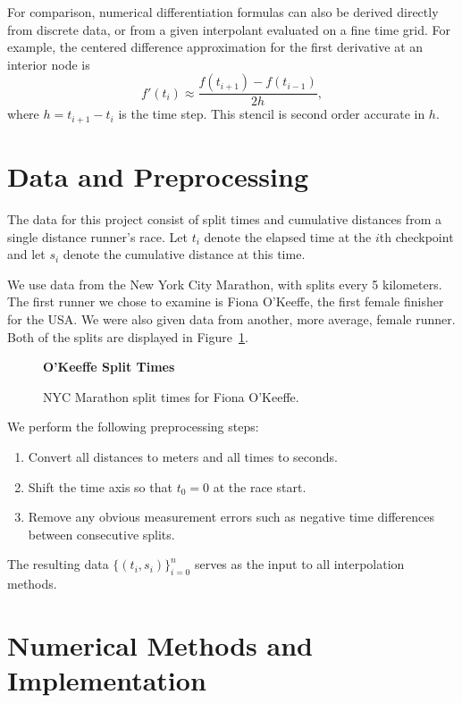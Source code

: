 \documentclass[12pt]{article}
\begin{document}
For comparison, numerical differentiation formulas can also be derived
directly from discrete data, or from a given interpolant evaluated on a fine time grid. For example, the centered difference
approximation for the first derivative at an interior node is
\begin{equation}
f'(t_i) \approx
\frac{f(t_{i+1}) - f(t_{i-1})}{2h},
\label{eq:centered_diff}
\end{equation}
where $h = t_{i+1} - t_i$ is the time step. This stencil is second
order accurate in $h$.

\section{Data and Preprocessing}
The data for this project consist of split times and cumulative
distances from a single distance runner's race. Let $t_i$ denote the elapsed time at the
$i$th checkpoint and let $s_i$ denote the cumulative distance at this
time.

We use data from the New York City Marathon, with splits every 5 kilometers. The first runner we chose to examine is Fiona O'Keeffe, the first female finisher for the USA. We were also given data from another, more average, female runner. Both of the splits are displayed in Figure~\ref{fig:splits}.

\begin{figure}[H]
  \centering
  \textbf{O'Keeffe Split Times}\\[0.5em]  %
  \caption{NYC Marathon split times for Fiona O'Keeffe.}
  \label{fig:splits}
\end{figure}

We perform the following preprocessing steps:
\begin{enumerate}
\item Convert all distances to meters and all times to seconds.
\item Shift the time axis so that $t_0 = 0$ at the race start.
\item Remove any obvious measurement errors such as negative time
      differences between consecutive splits.
\end{enumerate}
The resulting data $\{(t_i, s_i)\}_{i=0}^n$ serves as the input to
all interpolation methods.

\section{Numerical Methods and Implementation}
\end{document}
